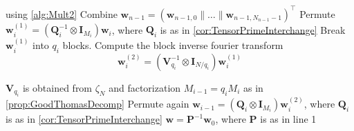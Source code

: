 \begin{algorithm}[h]
\begin{algorithmic}[1]
            using \cref{alg:Mult2} 
        \EndFor
        \State Combine \(\bm{w}_{n-1} = (\bm{w}_{n-1, 0} \parallel \ldots \parallel \bm{w}_{n-1, N_{n-1} - 1})^{\top}\)
            \State Permute \(\bm{w}_i^{(1)} = \left(\bm{Q}_i^{-1} \otimes \bm{I}_{M_i}\right) \bm{w}_i\), where \(\bm{Q}_i\) is as in \cref{cor:TensorPrimeInterchange}
            \State Break \(\bm{w}_i^{(1)}\) into \(q_i\) blocks. Compute the block inverse fourier transform
            \[\bm{w}_i^{(2)} = \left(\bm{V}_{q_i}^{-1} \otimes \bm{I}_{N/q_i}\right) \bm{w}_i^{(1)}\]

            \(\bm{V}_{q_i}\) is obtained from \(\zeta_N\) and factorization \(M_{i-1} = q_i M_i\) as in \cref{prop:GoodThomasDecomp}
            \State Permute again \(\bm{w}_{i-1} = \left(\bm{Q}_i \otimes \bm{I}_{M_i}\right) \bm{w}_i^{(2)}\), where \(\bm{Q}_i\) is as in \cref{cor:TensorPrimeInterchange}
        \EndFor
         \(\bm{w} = \bm{P}^{-1} \bm{w}_0\), where \(\bm{P}\) is as in line 1
    \end{algorithmic}
\end{algorithm}
